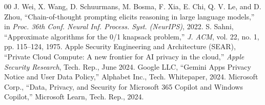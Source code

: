 \documentclass[conference,a4paper]{IEEEtran}
\begin{document}
\begin{thebibliography}{00}
 J. Wei, X. Wang, D. Schuurmans, M. Bosma, F. Xia, E. Chi, Q. V. Le, and D. Zhou, ``Chain-of-thought prompting elicits reasoning in large language models,'' in \textit{Proc. 36th Conf. Neural Inf. Process. Syst. (NeurIPS)}, 2022.
 S. Sahni, ``Approximate algorithms for the 0/1 knapsack problem,'' \textit{J. ACM}, vol. 22, no. 1, pp. 115--124, 1975.
 Apple Security Engineering and Architecture (SEAR), ``Private Cloud Compute: A new frontier for AI privacy in the cloud,'' \textit{Apple Security Research}, Tech. Rep., June 2024.
 Google LLC, ``Gemini Apps Privacy Notice and User Data Policy,'' Alphabet Inc., Tech. Whitepaper, 2024.
 Microsoft Corp., ``Data, Privacy, and Security for Microsoft 365 Copilot and Windows Copilot,'' Microsoft Learn, Tech. Rep., 2024.
\end{thebibliography}
\end{document}
